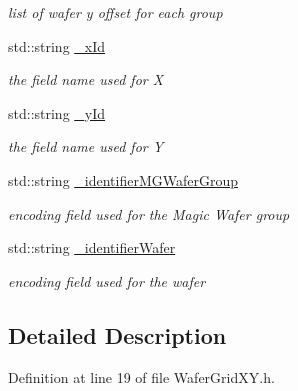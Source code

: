 \begin{DoxyCompactItemize}
\begin{DoxyCompactList}\small\item\em list of wafer y offset for each group \item\end{DoxyCompactList}\item 
std::string \hyperlink{class_d_d4hep_1_1_d_d_segmentation_1_1_wafer_grid_x_y_ac90f589f06ac860a0015e6a5e46b081b}{\_\-xId}
\begin{DoxyCompactList}\small\item\em the field name used for X \item\end{DoxyCompactList}\item 
std::string \hyperlink{class_d_d4hep_1_1_d_d_segmentation_1_1_wafer_grid_x_y_ac81f2246c4f13a9299036aab012d5887}{\_\-yId}
\begin{DoxyCompactList}\small\item\em the field name used for Y \item\end{DoxyCompactList}\item 
std::string \hyperlink{class_d_d4hep_1_1_d_d_segmentation_1_1_wafer_grid_x_y_ae4552eda8798fc3fb8c4bd155a7ee6eb}{\_\-identifierMGWaferGroup}
\begin{DoxyCompactList}\small\item\em encoding field used for the Magic Wafer group \item\end{DoxyCompactList}\item 
std::string \hyperlink{class_d_d4hep_1_1_d_d_segmentation_1_1_wafer_grid_x_y_aec0c4ade6e6eed2c87623f7e675b5fd1}{\_\-identifierWafer}
\begin{DoxyCompactList}\small\item\em encoding field used for the wafer \item\end{DoxyCompactList}\end{DoxyCompactItemize}


\subsection{Detailed Description}


Definition at line 19 of file WaferGridXY.h.

